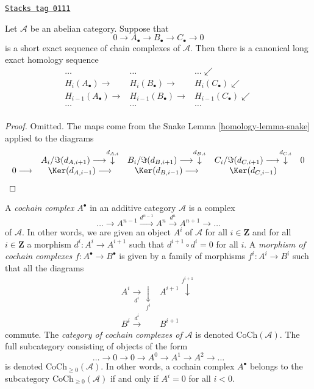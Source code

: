 \begin{lemma}
\label{homology-lemma-long-exact-sequence-chain}
\href{https://stacks.math.columbia.edu/tag/0111}{\texttt{Stacks tag 0111}}

Let $\mathcal{A}$ be an abelian category.
Suppose that
$$
0 \to
A_\bullet \to
B_\bullet \to
C_\bullet \to
0
$$
is a short exact sequence of chain complexes of $\mathcal{A}$.
Then there is a canonical long exact homology sequence
$$
\begin{array}{ccc}\ldots & \ldots & \ldots \swarrow \\ H_i(A_\bullet) \longrightarrow & H_i(B_\bullet) \longrightarrow & H_i(C_\bullet) \swarrow \\ H_{i - 1}(A_\bullet) \longrightarrow & H_{i - 1}(B_\bullet) \longrightarrow & H_{i - 1}(C_\bullet) \swarrow \\ \ldots & \ldots & \ldots \\  &  & \end{array}
$$
\end{lemma}

\begin{proof}

Omitted. The maps come from the Snake Lemma \ref{homology-lemma-snake}
applied to the diagrams
$$
\begin{array}{ccccc} & A_i/\Im(d_{A, i + 1}) \longrightarrow\overset{d_{A, i}}{\downarrow} & B_i/\Im(d_{B, i + 1}) \longrightarrow\overset{d_{B, i}}{\downarrow} & C_i/\Im(d_{C, i + 1}) \longrightarrow\overset{d_{C, i}}{\downarrow} & 0 \\ 0 \longrightarrow & \Ker(d_{A, i - 1}) \longrightarrow & \Ker(d_{B, i - 1}) \longrightarrow & \Ker(d_{C, i - 1}) & \end{array}
$$
\end{proof}

A {\it cochain complex $A^\bullet$} in an additive category $\mathcal{A}$
is a complex
$$
\ldots \to
A^{n - 1} \xrightarrow{d^{n - 1}}
A^n \xrightarrow{d^n}
A^{n + 1} \to
\ldots
$$
of $\mathcal{A}$. In other words, we are given an object $A^i$ of
$\mathcal{A}$ for all $i \in \mathbf{Z}$ and for
all $i \in \mathbf{Z}$ a morphism $d^i : A^i \to A^{i + 1}$ such that
$d^{i + 1} \circ d^i = 0$ for all $i$. A {\it morphism of cochain
complexes $f : A^\bullet \to B^\bullet$} is given by a
family of morphisms $f^i : A^i \to B^i$ such that all
the diagrams
$$
\begin{array}{cc}A^i \underset{d^i}{\longrightarrow}\underset{f^i}{\downarrow} & A^{i + 1} \overset{f^{i + 1}}{\downarrow} \\ B^i \overset{d^i}{\longrightarrow} & B^{i + 1}\end{array}
$$
commute. The {\it category of cochain complexes of $\mathcal{A}$}
is denoted $\text{CoCh}(\mathcal{A})$. The full subcategory consisting
of objects of the form
$$
\ldots \to 0 \to 0 \to A^0 \to A^1 \to A^2 \to \ldots
$$
is denoted $\text{CoCh}_{\geq 0}(\mathcal{A})$.
In other words, a cochain complex $A^\bullet$ belongs to the subcategory
$\text{CoCh}_{\geq 0}(\mathcal{A})$ if and only if
$A^i = 0$ for all $i < 0$.

